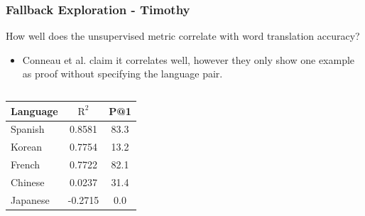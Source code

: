 \documentclass{beamer}
\begin{document}
\begin{frame}
  \frametitle{Fallback Exploration - Timothy}
  How well does the unsupervised metric correlate with word translation accuracy?
  \begin{itemize}
  \item Conneau et al. claim it correlates well, however they only show one example
    as proof without specifying the language pair.
  \end{itemize}
  \begin{columns}
    \begin{table}
      \begin{tabular}{l | c | c }
      Language & $\text{R}^2$ & P@1 \\
      \hline \hline
      Spanish & 0.8581 & 83.3 \\
      Korean & 0.7754 & 13.2 \\
      French & 0.7722 & 82.1 \\
      Chinese & 0.0237 & 31.4 \\
      Japanese & -0.2715 & 0.0
      \end{tabular}
    \end{table}
       \\
  \end{columns}
\end{frame}
\end{document}
